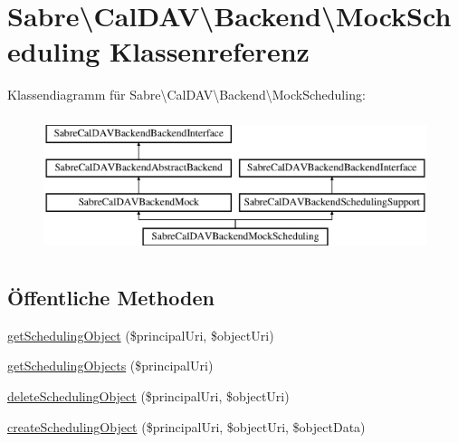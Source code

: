 \hypertarget{class_sabre_1_1_cal_d_a_v_1_1_backend_1_1_mock_scheduling}{}\section{Sabre\textbackslash{}Cal\+D\+AV\textbackslash{}Backend\textbackslash{}Mock\+Scheduling Klassenreferenz}
\label{class_sabre_1_1_cal_d_a_v_1_1_backend_1_1_mock_scheduling}
Klassendiagramm für Sabre\textbackslash{}Cal\+D\+AV\textbackslash{}Backend\textbackslash{}Mock\+Scheduling\+:\begin{figure}[H]
\begin{center}
\leavevmode
\includegraphics[height=4.000000cm]{class_sabre_1_1_cal_d_a_v_1_1_backend_1_1_mock_scheduling}
\end{center}
\end{figure}
\subsection*{Öffentliche Methoden}
\begin{DoxyCompactItemize}
\item 
\mbox{\hyperlink{class_sabre_1_1_cal_d_a_v_1_1_backend_1_1_mock_scheduling_ae7d9e2f54ca746a2409ccd4529c32f18}{get\+Scheduling\+Object}} (\$principal\+Uri, \$object\+Uri)
\item 
\mbox{\hyperlink{class_sabre_1_1_cal_d_a_v_1_1_backend_1_1_mock_scheduling_a3c4759a7ce8f76a5dc15319cf15c5031}{get\+Scheduling\+Objects}} (\$principal\+Uri)
\item 
\mbox{\hyperlink{class_sabre_1_1_cal_d_a_v_1_1_backend_1_1_mock_scheduling_a8cb76d18dfa6c8a346343041a21357b4}{delete\+Scheduling\+Object}} (\$principal\+Uri, \$object\+Uri)
\item 
\mbox{\hyperlink{class_sabre_1_1_cal_d_a_v_1_1_backend_1_1_mock_scheduling_ab0482b3d3c97f9a40ebd73864fb6556d}{create\+Scheduling\+Object}} (\$principal\+Uri, \$object\+Uri, \$object\+Data)
\end{DoxyCompactItemize}

